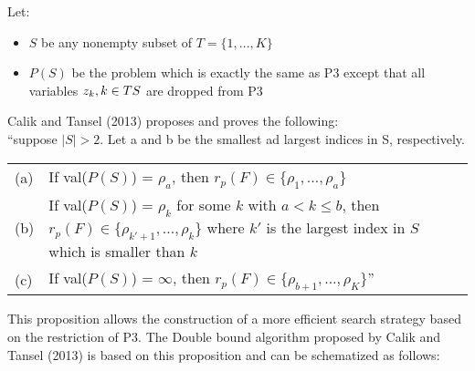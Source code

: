 Let:
\begin{itemize}
	\item $S$ be any nonempty subset of $T = \lbrace 1, ..., K \rbrace$
	\item $P(S)$ be the problem which is exactly the same as P3 except that all variables $z_k, k \in T\\S$ are dropped from P3
\end{itemize}

Calik and Tansel (2013) proposes and proves the following:\\
``suppose $|S| > 2$. Let a and b be the smallest ad largest indices in S, respectively.\\
\begin{tabular}{l l}
(a) & If val($P(S)$) = $\rho_a$, then $r_p(F) \in \lbrace \rho_1, ..., \rho_a \rbrace$\\
(b) & If val($P(S)$) = $\rho_k$ for some $k$ with $a < k \leq b$, then $r_p(F) \in \lbrace \rho_{k'+1}, ..., \rho_k \rbrace$ where $k'$ is the largest index in $S$ which is smaller than $k$ \\
(c) & If val($P(S)$) = $\infty$, then $r_p(F) \in \lbrace \rho_{b+1}, ..., \rho_K \rbrace$''\\
\end{tabular}

This proposition allows the construction of a more efficient search strategy based on the restriction of P3. The Double bound algorithm proposed by Calik and Tansel (2013) is based on this proposition and can be schematized as follows: